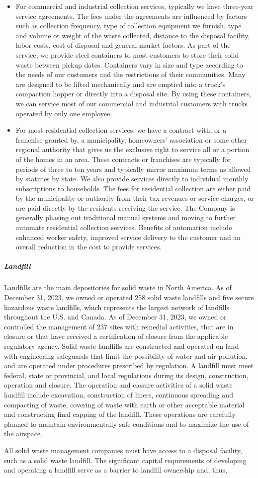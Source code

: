 \documentclass{article}
\begin{document}
\begin{itemize}
    \item For commercial and industrial collection services, typically we have three-year service agreements. The fees under the agreements are influenced by factors such as collection frequency, type of collection equipment we furnish, type and volume or weight of the waste collected, distance to the disposal facility, labor costs, cost of disposal and general market factors. As part of the service, we provide steel containers to most customers to store their solid waste between pickup dates. Containers vary in size and type according to the needs of our customers and the restrictions of their communities. Many are designed to be lifted mechanically and are emptied into a truck’s compaction hopper or directly into a disposal site. By using these containers, we can service most of our commercial and industrial customers with trucks operated by only one employee.
    
    \item For most residential collection services, we have a contract with, or a franchise granted by, a municipality, homeowners’ association or some other regional authority that gives us the exclusive right to service all or a portion of the homes in an area. These contracts or franchises are typically for periods of three to ten years and typically mirror maximum terms as allowed by statutes by state. We also provide services directly to individual monthly subscriptions to households. The fees for residential collection are either paid by the municipality or authority from their tax revenues or service charges, or are paid directly by the residents receiving the service. The Company is generally phasing out traditional manual systems and moving to further automate residential collection services. Benefits of automation include enhanced worker safety, improved service delivery to the customer and an overall reduction in the cost to provide services.
\end{itemize}

\subparagraph{Landfill}
Landfills are the main depositories for solid waste in North America. As of December 31, 2023, we owned or operated 258 solid waste landfills and five secure hazardous waste landfills, which represents the largest network of landfills throughout the U.S. and Canada. As of December 31, 2023, we owned or controlled the management of 237 sites with remedial activities, that are in closure or that have received a certification of closure from the applicable regulatory agency. Solid waste landfills are constructed and operated on land with engineering safeguards that limit the possibility of water and air pollution, and are operated under procedures prescribed by regulation. A landfill must meet federal, state or provincial, and local regulations during its design, construction, operation and closure. The operation and closure activities of a solid waste landfill include excavation, construction of liners, continuous spreading and compacting of waste, covering of waste with earth or other acceptable material and constructing final capping of the landfill. These operations are carefully planned to maintain environmentally safe conditions and to maximize the use of the airspace.

All solid waste management companies must have access to a disposal facility, such as a solid waste landfill. The significant capital requirements of developing and operating a landfill serve as a barrier to landfill ownership and, thus,
\end{document}
